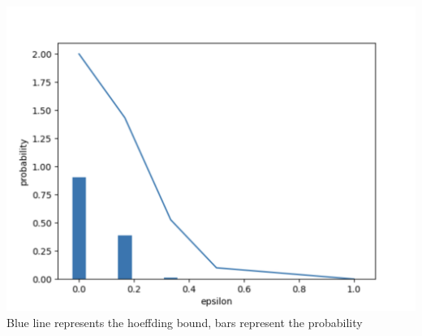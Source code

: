 \documentclass{article}
\begin{document}
\begin{enumerate}
\begin{enumerate}[label=(\alph*)]
\begin{center}
                \includegraphics[scale=0.5]{images/p1.7.png}\\
                Blue line represents the hoeffding bound, bars represent the probability
            \end{center}
        \end{enumerate}
    \end{enumerate}
\end{document}
